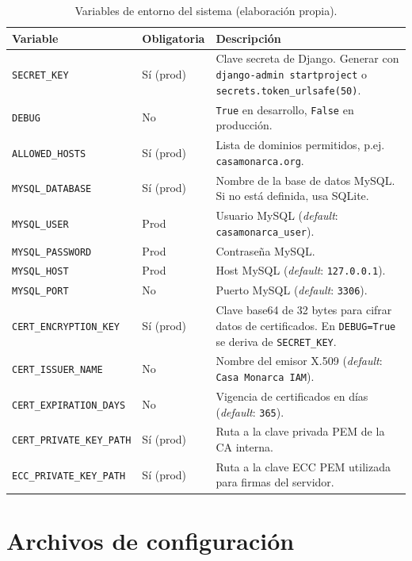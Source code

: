 \documentclass[10pt,letterpaper]{report}
\begin{document}
\begin{table}[H]
\centering
\caption{Variables de entorno del sistema (elaboración propia).}
\label{tab:envvars}
\begin{tabularx}{\textwidth}{l l X}
\toprule
\textbf{Variable} & \textbf{Obligatoria} & \textbf{Descripción} \\
\midrule
\texttt{SECRET\_KEY} & Sí (prod) & Clave secreta de Django. Generar con \texttt{django-admin startproject} o \texttt{secrets.token\_urlsafe(50)}. \\
\texttt{DEBUG} & No & \texttt{True} en desarrollo, \texttt{False} en producción. \\
\texttt{ALLOWED\_HOSTS} & Sí (prod) & Lista de dominios permitidos, p.ej. \texttt{casamonarca.org}. \\
\texttt{MYSQL\_DATABASE} & Sí (prod) & Nombre de la base de datos MySQL. Si no está definida, usa SQLite. \\
\texttt{MYSQL\_USER} & Prod & Usuario MySQL (\textit{default}: \texttt{casamonarca\_user}). \\
\texttt{MYSQL\_PASSWORD} & Prod & Contraseña MySQL. \\
\texttt{MYSQL\_HOST} & Prod & Host MySQL (\textit{default}: \texttt{127.0.0.1}). \\
\texttt{MYSQL\_PORT} & No & Puerto MySQL (\textit{default}: \texttt{3306}). \\
\texttt{CERT\_ENCRYPTION\_KEY} & Sí (prod) & Clave base64 de 32 bytes para cifrar datos de certificados. En \texttt{DEBUG=True} se deriva de \texttt{SECRET\_KEY}. \\
\texttt{CERT\_ISSUER\_NAME} & No & Nombre del emisor X.509 (\textit{default}: \texttt{Casa Monarca IAM}). \\
\texttt{CERT\_EXPIRATION\_DAYS} & No & Vigencia de certificados en días (\textit{default}: \texttt{365}). \\
\texttt{CERT\_PRIVATE\_KEY\_PATH} & Sí (prod) & Ruta a la clave privada PEM de la CA interna. \\
\texttt{ECC\_PRIVATE\_KEY\_PATH} & Sí (prod) & Ruta a la clave ECC PEM utilizada para firmas del servidor. \\
\bottomrule
\end{tabularx}
\end{table}

\section{Archivos de configuración}
\end{document}
